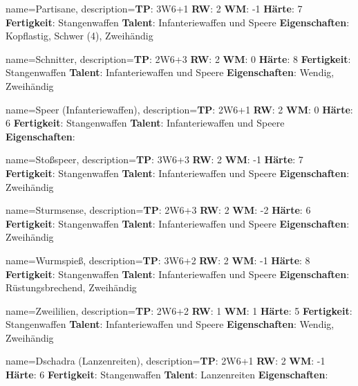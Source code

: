 {
    name={Partisane},
    description={\textbf{TP}: 3W6+1 \textbf{RW}: 2 \textbf{WM}: -1 \textbf{Härte}: 7        \textbf{Fertigkeit}: Stangenwaffen \textbf{Talent}: Infanteriewaffen und Speere \textbf{{Eigenschaften}}: Kopflastig, Schwer (4), Zweihändig}
}



{
    name={Schnitter},
    description={\textbf{TP}: 2W6+3 \textbf{RW}: 2 \textbf{WM}: 0 \textbf{Härte}: 8        \textbf{Fertigkeit}: Stangenwaffen \textbf{Talent}: Infanteriewaffen und Speere \textbf{{Eigenschaften}}: Wendig, Zweihändig}
}



{
    name={Speer (Infanteriewaffen)},
    description={\textbf{TP}: 2W6+1 \textbf{RW}: 2 \textbf{WM}: 0 \textbf{Härte}: 6        \textbf{Fertigkeit}: Stangenwaffen \textbf{Talent}: Infanteriewaffen und Speere \textbf{{Eigenschaften}}: }
}



{
    name={Stoßspeer},
    description={\textbf{TP}: 3W6+3 \textbf{RW}: 2 \textbf{WM}: -1 \textbf{Härte}: 7        \textbf{Fertigkeit}: Stangenwaffen \textbf{Talent}: Infanteriewaffen und Speere \textbf{{Eigenschaften}}: Zweihändig}
}



{
    name={Sturmsense},
    description={\textbf{TP}: 2W6+3 \textbf{RW}: 2 \textbf{WM}: -2 \textbf{Härte}: 6        \textbf{Fertigkeit}: Stangenwaffen \textbf{Talent}: Infanteriewaffen und Speere \textbf{{Eigenschaften}}: Zweihändig}
}



{
    name={Wurmspieß},
    description={\textbf{TP}: 3W6+2 \textbf{RW}: 2 \textbf{WM}: -1 \textbf{Härte}: 8        \textbf{Fertigkeit}: Stangenwaffen \textbf{Talent}: Infanteriewaffen und Speere \textbf{{Eigenschaften}}: Rüstungsbrechend, Zweihändig}
}



{
    name={Zweililien},
    description={\textbf{TP}: 2W6+2 \textbf{RW}: 1 \textbf{WM}: 1 \textbf{Härte}: 5        \textbf{Fertigkeit}: Stangenwaffen \textbf{Talent}: Infanteriewaffen und Speere \textbf{{Eigenschaften}}: Wendig, Zweihändig}
}



{
    name={Dschadra (Lanzenreiten)},
    description={\textbf{TP}: 2W6+1 \textbf{RW}: 2 \textbf{WM}: -1 \textbf{Härte}: 6        \textbf{Fertigkeit}: Stangenwaffen \textbf{Talent}: Lanzenreiten \textbf{{Eigenschaften}}: }
}



